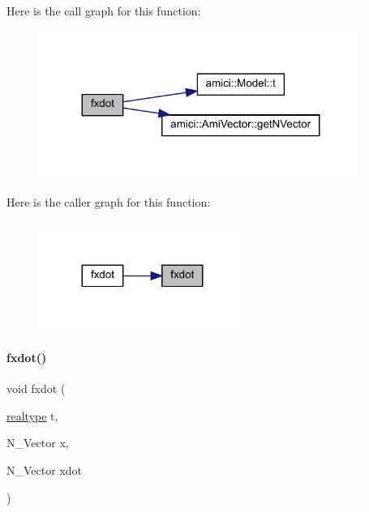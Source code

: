 Here is the call graph for this function\+:
\nopagebreak
\begin{figure}[H]
\begin{center}
\leavevmode
\includegraphics[width=299pt]{classamici_1_1_model___o_d_e_a33461bc9bc047e838607d958eb29621a_cgraph}
\end{center}
\end{figure}
Here is the caller graph for this function\+:
\nopagebreak
\begin{figure}[H]
\begin{center}
\leavevmode
\includegraphics[width=191pt]{classamici_1_1_model___o_d_e_a33461bc9bc047e838607d958eb29621a_icgraph}
\end{center}
\end{figure}
\mbox{\label{classamici_1_1_model___o_d_e_aa08f195ec3f1e9ec3d208abfbf27b23a}} 
\paragraph{\texorpdfstring{fxdot()}{fxdot()}\hspace{0.1cm}{\footnotesize\ttfamily [2/3]}}
{\footnotesize\ttfamily void fxdot (\begin{DoxyParamCaption}\item[{\mbox{\hyperlink{namespaceamici_a1bdce28051d6a53868f7ccbf5f2c14a3}{realtype}}}]{t,  }\item[{N\+\_\+\+Vector}]{x,  }\item[{N\+\_\+\+Vector}]{xdot }\end{DoxyParamCaption})}

